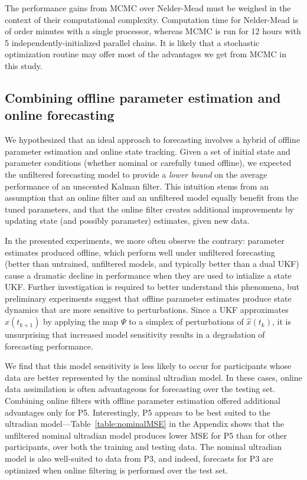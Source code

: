 \documentclass[10pt,letterpaper]{article}
\begin{document}
The performance gains from MCMC over Nelder-Mead must be weighed in the context of their computational complexity. Computation time for Nelder-Mead is of order minutes with a single processor, whereas MCMC is run for 12 hours with 5 independently-initialized parallel chains. It is likely that a stochastic optimization routine may offer most of the advantages we get from MCMC in this study.

\subsection{Combining offline parameter estimation and online forecasting}
We hypothesized that an ideal approach to forecasting involves a hybrid of offline parameter estimation and online state tracking. Given a set of initial state and parameter conditions (whether nominal or carefully tuned offline), we expected the unfiltered forecasting model to provide a \emph{lower bound} on the average performance of an unscented Kalman filter. This intuition stems from an assumption that an online filter and an unfiltered model equally benefit from the tuned parameters, and that the online filter creates additional improvements by updating state (and possibly parameter) estimates, given new data.

In the presented experiments, we more often observe the contrary: parameter estimates produced offline, which perform well under unfiltered forecasting (better than untrained, unfiltered models, and typically better than a dual UKF) cause a dramatic decline in performance when they are used to intialize a state UKF. Further investigation is required to better understand this phenomena, but preliminary experiments suggest that offline parameter estimates produce state dynamics that are more sensitive to perturbations. Since a UKF approximates $\hat{x}(t_{k+1})$ by applying the map $\Psi$ to a simplex of perturbations of $\hat{x}(t_k)$, it is unsurprising that increased model sensitivity results in a degradation of forecasting performance.

We find that this model sensitivity is less likely to occur for participants whose data are better represented by the nominal ultradian model. In these cases, online data assimilation is often advantageous for forecasting over the testing set. Combining online filters with offline parameter estimation offered additional advantages only for P5. Interestingly, P5 appears to be best suited to the ultradian model---Table~\ref{table:nominalMSE} in the Appendix shows that the unfiltered nominal ultradian model produces lower MSE for P5 than for other participants, over both the training and testing data. The nominal ultradian model is also well-suited to data from P3, and indeed, forecasts for P3 are optimized when online filtering is performed over the test set.
\end{document}
